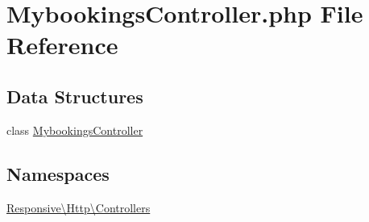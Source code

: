 \hypertarget{_mybookings_controller_8php}{}\section{Mybookings\+Controller.\+php File Reference}
\label{_mybookings_controller_8php}
\subsection*{Data Structures}
\begin{DoxyCompactItemize}
\item 
class \mbox{\hyperlink{class_responsive_1_1_http_1_1_controllers_1_1_mybookings_controller}{Mybookings\+Controller}}
\end{DoxyCompactItemize}
\subsection*{Namespaces}
\begin{DoxyCompactItemize}
\item 
 \mbox{\hyperlink{namespace_responsive_1_1_http_1_1_controllers}{Responsive\textbackslash{}\+Http\textbackslash{}\+Controllers}}
\end{DoxyCompactItemize}
